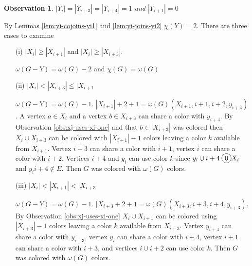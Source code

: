 \documentclass[12pt]{article}
\newcommand*\circled[1]{\tikz[baseline=(char.base)]{
            \node[shape=circle,draw,inner sep=2pt] (char) {#1};}}
\newtheorem{Observation}[Theorem]{Observation}
\begin{document}
\begin{Observation}\label{obs:yi-yi3-yi4} 
$|Y_{i}| = |Y_{i+3}| = |Y_{i+4}| = 1$ and $|Y_{i+1}| = 0$
\end{Observation} 
\begin{minipage}{0.5\textwidth}%
	By Lemmas \ref{lem:yi-cojoins-yi1} and \ref{lem:yi-joins-yi2} $\chi(Y) = 2$. There are three cases to examine
	\begin{itemize}
	\item[(i)]
		$|X_i| \geq |X_{i+1}|$ and $|X_i| \geq |X_{i+3}|$.

		$\omega(G - Y) = \omega(G) - 2$ and $\chi(G) = \omega(G)$
	\item[(ii)]
		$|X_i| < |X_{i+3}| \leq |X_{i+1}$

		$\omega(G - Y) = \omega(G) - 1$. $|X_{i+1}| + 2 + 1 = \omega(G) (X_{i+1}, i+1, i+2, y_{i+4})$. A vertex $a \in X_i$ and a vertex $b \in X_{i+3}$ can share a color with $y_{i+4}$. By Observation \ref{obs:xj-uses-xi-one} and that $b \in |X_{i+3}|$ was colored then $X_{i} \cup X_{i+3}$ can be colored with $|X_{i+1}| -1$ colors leaving a color $k$ available from $X_{i+1}$. Vertex $i+3$ can share a color with $i+1$, vertex $i$ can share a color with $i+2$. Vertices $i+4$ and $y_{i}$ can use color $k$ since $y_{i} \cup i+4 \; \circled{0} X_i$ and $y_{i}i+4 \not \in E$. Then $G$ was colored with $\omega(G)$ colors.

	\item[(iii)]
		$|X_i| < |X_{i+1}| < |X_{i+3}$

		$\omega(G - Y) = \omega(G) - 1$. $|X_{i+3} + 2 + 1 = \omega(G) (X_{i+3}, i+3, i+4, y_{i+3})$. By Observation \ref{obs:xj-uses-xi-one} $X_i \cup X_{i+1}$ can be colored using $|X_{i+3}| -1 $ colors leaving a color $k$ available from $X_{i+3}$. Vertex $y_{i+4}$ can share a color with $y_{i+3}$, vertex $y_i$ can share a color with $i+4$, vertex $i+1$ can share a color with $i+3$, and vertices $i \cup i+2$ can use color $k$. Then $G$ was colored with $\omega(G)$ colors. 
	\end{itemize}
\end{minipage}
\hfill
\end{document}

